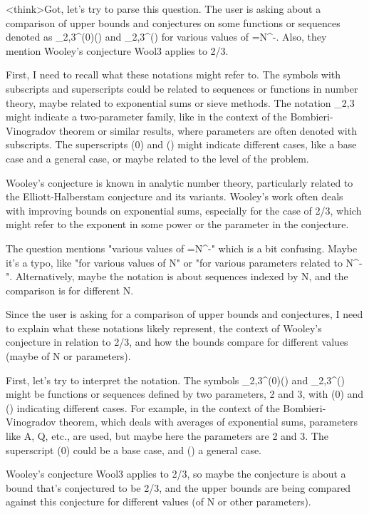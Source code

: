 <think>Got, let's try to parse this question. The user is asking about a comparison of upper bounds and conjectures on some functions or sequences denoted as _2,3^(0)() and _2,3^() for various values of =N^-. Also, they mention Wooley's conjecture Wool3 applies to 2/3. 

First, I need to recall what these notations might refer to. The symbols with subscripts and superscripts could be related to sequences or functions in number theory, maybe related to exponential sums or sieve methods. The notation _2,3 might indicate a two-parameter family, like in the context of the Bombieri-Vinogradov theorem or similar results, where parameters are often denoted with subscripts. The superscripts (0) and () might indicate different cases, like a base case and a general case, or maybe related to the level of the problem.

Wooley's conjecture is known in analytic number theory, particularly related to the Elliott-Halberstam conjecture and its variants. Wooley's work often deals with improving bounds on exponential sums, especially for the case of 2/3, which might refer to the exponent in some power or the parameter in the conjecture. 

The question mentions "various values of =N^-" which is a bit confusing. Maybe it's a typo, like "for various values of N" or "for various parameters related to N^-". Alternatively, maybe the notation is about sequences indexed by N, and the comparison is for different N. 

Since the user is asking for a comparison of upper bounds and conjectures, I need to explain what these notations likely represent, the context of Wooley's conjecture in relation to 2/3, and how the bounds compare for different values (maybe of N or parameters). 

First, let's try to interpret the notation. The symbols _2,3^(0)() and _2,3^() might be functions or sequences defined by two parameters, 2 and 3, with (0) and () indicating different cases. For example, in the context of the Bombieri-Vinogradov theorem, which deals with averages of exponential sums, parameters like A, Q, etc., are used, but maybe here the parameters are 2 and 3. The superscript (0) could be a base case, and () a general case. 

Wooley's conjecture Wool3 applies to 2/3, so maybe the conjecture is about a bound that's conjectured to be 2/3, and the upper bounds are being compared against this conjecture for different values (of N or other parameters). 

